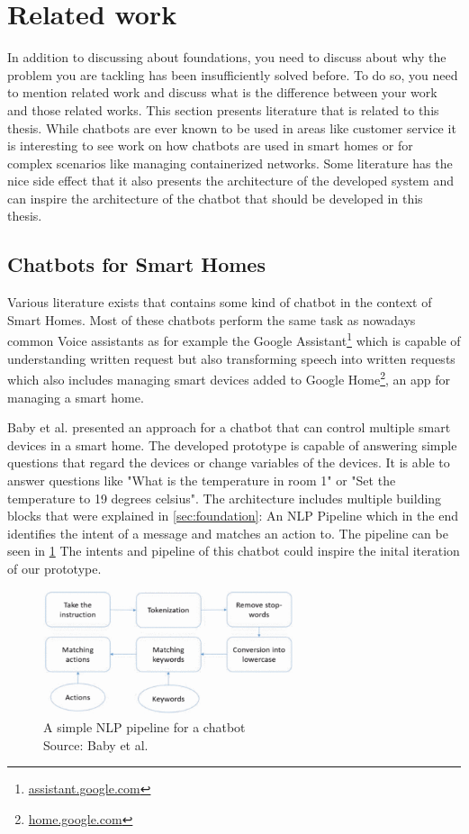 \newpage
\section{Related work}
In addition to discussing about foundations, you need to discuss about why the problem you are tackling has been insufficiently solved before. To do so, you need to mention related work and discuss what is the difference between your work and those related works.
This section presents literature that is related to this thesis.
While chatbots are ever known to be used in areas like customer service it is interesting to see work on how chatbots are used in smart homes or for complex scenarios like managing containerized networks.
Some literature has the nice side effect that it also presents the architecture of the developed system and can inspire the architecture of the chatbot that should be developed in this thesis.

\subsection*{Chatbots for Smart Homes}
Various literature exists that contains some kind of chatbot in the context of Smart Homes.
Most of these chatbots perform the same task as nowadays common Voice assistants as for example the Google Assistant\footnote{\href{https://assistant.google.com/}{assistant.google.com}} which is capable of understanding written request but also transforming speech into written requests which also includes managing smart devices added to Google Home\footnote{\href{https://home.google.com/intl/de_de/the-latest/}{home.google.com}}, an app for managing a smart home.

Baby et al.\cite{baby_home_2017} presented an approach for a chatbot that can control multiple smart devices in a smart home.
The developed prototype is capable of answering simple questions that regard the devices or change variables of the devices.
It is able to answer questions like "What is the temperature in room 1" or "Set the temperature to 19 degrees celsius".
The architecture includes multiple building blocks that were explained in \cref{sec:foundation}: An NLP Pipeline which in the end identifies the intent of a message and matches an action to.
The pipeline can be seen in \cref{fig:chatbot-pipeline-baby}
The intents and pipeline of this chatbot could inspire the inital iteration of our prototype. 
\begin{figure}[h]
\centering
\includegraphics[width=0.66\textwidth]{graphics/baby2017chatbot.png}
\caption{A simple NLP pipeline for a chatbot \\Source: Baby et al. \cite{baby_home_2017}}
\label{fig:chatbot-pipeline-baby}
\end{figure}

